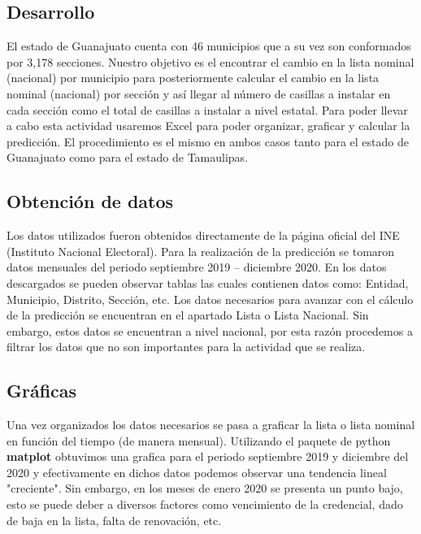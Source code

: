 \documentclass[12pt,a4paper]{report}
\begin{document}
\begin{center}
\item \section*{Desarrollo}
\end{center}
El estado de Guanajuato cuenta con 46 municipios que a su vez son conformados por 3,178 secciones. Nuestro objetivo es el encontrar el cambio en la lista nominal (nacional) por municipio para posteriormente calcular el cambio en la lista nominal (nacional) por sección y así llegar al número de casillas a instalar en cada sección como el total de casillas a instalar a nivel estatal. Para poder llevar a cabo esta actividad usaremos Excel para poder organizar, graficar y calcular la predicción. El procedimiento es el mismo en ambos casos tanto para el estado de Guanajuato como para el estado de Tamaulipas.\cite{ine}

\vspace{0.5cm}

\subsection*{Obtención de datos}

Los datos utilizados fueron obtenidos directamente de la página oficial del INE (Instituto Nacional Electoral). Para la realización de la predicción se tomaron datos mensuales del periodo septiembre 2019 – diciembre 2020. En los datos descargados se pueden observar tablas las cuales contienen datos como: Entidad, Municipio, Distrito, Sección, etc. Los datos necesarios para avanzar con el cálculo de la predicción se encuentran en el apartado Lista o Lista Nacional. Sin embargo, estos datos se encuentran a nivel nacional, por esta razón procedemos a filtrar los datos que no son importantes para la actividad que se realiza.

\subsection*{Gráficas}
Una vez organizados los datos necesarios se pasa a graficar la lista o lista nominal en función del tiempo (de manera mensual). Utilizando el paquete de python {\bfseries matplot} obtuvimos una grafica para el periodo septiembre 2019 y diciembre del 2020 y efectivamente en dichos datos podemos observar una tendencia lineal "creciente". Sin embargo, en los meses de enero 2020 se presenta un punto bajo, esto se puede deber a diversos factores como vencimiento de la credencial, dado de baja en la lista, falta de renovación, etc.
 
\end{document}
